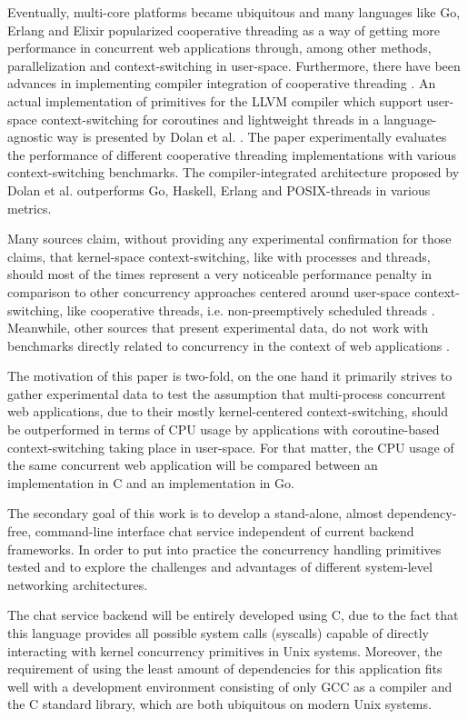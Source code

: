 Eventually, multi-core platforms became ubiquitous and many languages like Go, Erlang and Elixir popularized cooperative threading as a way of getting more performance in concurrent web applications through, among other methods, parallelization and context-switching in user-space. Furthermore, there have been advances in implementing compiler integration of cooperative threading \cite{2013ContextSwitching}\cite{2008Pekka}. An actual implementation of primitives for the LLVM compiler which support user-space context-switching for coroutines and lightweight threads in a language-agnostic way is presented by Dolan et al. \cite{2013ContextSwitching}. The paper experimentally evaluates the performance of different cooperative threading implementations with various context-switching benchmarks. The compiler-integrated architecture proposed by Dolan et al. outperforms Go, Haskell, Erlang and POSIX-threads in various metrics. 

Many sources claim, without providing any experimental confirmation for those claims, that kernel-space context-switching, like with processes and threads, should most of the times represent a very noticeable performance penalty in comparison to other concurrency approaches centered around user-space context-switching, like cooperative threads, i.e. non-preemptively scheduled threads \cite{2003Events}\cite{2005Threads}\cite{Cox-Buday2017}\cite{Kerrisk2010}. Meanwhile, other sources that present experimental data, do not work with benchmarks directly related to concurrency in the context of web applications \cite{2013ContextSwitching}\cite{2008Pekka}. 

The motivation of this paper is two-fold, on the one hand it primarily strives to gather experimental data to test the assumption that multi-process concurrent web applications, due to their mostly kernel-centered context-switching, should be outperformed in terms of CPU usage by applications with coroutine-based context-switching taking place in user-space. For that matter, the CPU usage of the same concurrent web application will be compared between an implementation in C and an implementation in Go.

The secondary goal of this work is to develop a stand-alone, almost dependency-free, command-line interface chat service independent of current backend frameworks. In order to put into practice the concurrency handling primitives tested and to explore the challenges and advantages of different system-level networking architectures.

The chat service backend will be entirely developed using C, due to the fact that this language provides all possible system calls (syscalls) capable of directly interacting with kernel concurrency primitives in Unix systems. Moreover, the requirement of using the least amount of dependencies for this application fits well with a development environment consisting of only GCC as a compiler and the C standard library, which are both ubiquitous on modern Unix systems. 

